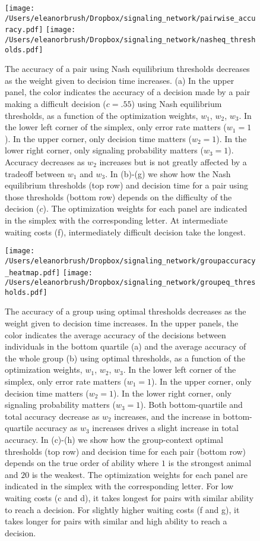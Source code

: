 \documentclass{article}
\begin{document}
%
%
%

\begin{figure}[ht]
\texttt{[image: /Users/eleanorbrush/Dropbox/signaling\_network/pairwise\_accuracy.pdf]}
\texttt{[image: /Users/eleanorbrush/Dropbox/signaling\_network/nasheq\_thresholds.pdf]}
\caption{\label{nasheq_thresholds}  The accuracy of a pair using Nash equilibrium thresholds decreases as the weight given to decision time increases.  (a) In the upper panel, the color indicates the accuracy of a decision made by a pair making a difficult decision ($c=.55$) using Nash equilibrium thresholds, as a function of the optimization weights, $w_1$, $w_2$, $w_3$.  In the lower left corner of the simplex, only error rate matters ($w_1=1$).  In the upper corner, only decision time matters ($w_2=1$).  In the lower right corner, only signaling probability matters ($w_3=1$). Accuracy decreases as $w_2$ increases but is not greatly affected by a tradeoff between $w_1$ and $w_3$. In (b)-(g) we show how the Nash equilibrium thresholds (top row) and decision time for a pair using those thresholds (bottom row) depends on the difficulty of the decision ($c$). The optimization weights for each panel are indicated in the simplex with the corresponding letter.  At intermediate waiting costs (f), intermediately difficult decision take the longest.}
\end{figure}

\begin{figure}
\texttt{[image: /Users/eleanorbrush/Dropbox/signaling\_network/groupaccuracy\_heatmap.pdf]}
\texttt{[image: /Users/eleanorbrush/Dropbox/signaling\_network/groupeq\_thresholds.pdf]}
\caption{\label{groupeq_thresholds}   The accuracy of a group using optimal thresholds decreases as the weight given to decision time increases.  In the upper panels, the color indicates the average accuracy of the decisions between individuals in the bottom quartile (a) and the average accuracy of the whole group (b) using optimal thresholds, as a function of the optimization weights, $w_1$, $w_2$, $w_3$.  In the lower left corner of the simplex, only error rate matters ($w_1=1$).  In the upper corner, only decision time matters ($w_2=1$).  In the lower right corner, only signaling probability matters ($w_3=1$). Both bottom-quartile and total accuracy decrease as $w_2$ increases, and the increase in bottom-quartile accuracy as $w_3$ increases drives a slight increase in total accuracy.  In (c)-(h) we show how the group-context optimal thresholds (top row) and decision time for each pair (bottom row) depends on the true order of ability where $1$ is the strongest animal and $20$ is the weakest. The optimization weights for each panel are indicated in the simplex with the corresponding letter.  For low waiting costs (c and d), it takes longest for pairs with similar ability to reach a decision.  For slightly higher waiting costs (f and g), it takes longer for pairs with similar and high ability to reach a decision.}
\end{figure}
\end{document}
